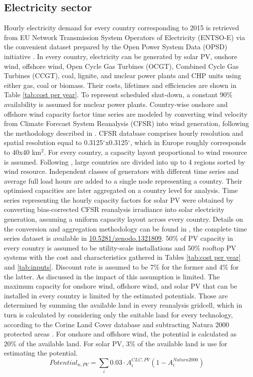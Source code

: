 \documentclass[3p]{elsarticle} %
\begin{document}
\subsection{Electricity sector}
Hourly electricity demand for every country corresponding to 2015 is retrieved from EU Network Transmission System Operators of Electricity (ENTSO-E) via the convenient dataset prepared by the Open Power System Data (OPSD) initiative \cite{OPSD}. In every country, electricity can be generated by solar PV, onshore wind, offshore wind, Open Cycle Gas Turbines (OCGT), Combined Cycle Gas Turbines (CCGT), coal, lignite, and nuclear power plants and CHP units using either gas, coal or biomass. Their costs, lifetimes and efficiencies are shown in Table \ref{tab:cost per year}.  To represent scheduled shut-down, a constant 90\% availability is assumed for nuclear power plants. Country-wise onshore and offshore wind capacity factor time series are modeled by converting wind velocity from Climate Forecast System Reanalysis (CFSR) \cite{CFSR} into wind generation, following the methodology described in \cite{Andresen_2015}. CFSR database comprises hourly resolution and spatial resolution equal to 0.3125$^{\circ}$x0.3125$^{\circ}$, which in Europe roughly corresponds to 40x40 km$^2$. For every country, a capacity layout proportional to wind resource is assumed. Following \cite{Schlachtberger_2017}, large countries are divided into up to 4 regions sorted by wind resource. Independent classes of generators with different time series and average full load hours are added to a single node representing a country. Their optimised capacities are later aggregated on a country level for analysis. Time series representing the hourly capacity factors for solar PV were obtained by converting bias-corrected CFSR reanalysis irradiance into solar electricity generation, assuming a uniform capacity layout across every country. Details on the conversion and aggregation methodology can be found in \cite{Victoria_2019b}, the complete time series dataset is available in \href{https://doi.org/10.5281/zenodo.1321809}{10.5281/zenodo.1321809}. 50\% of PV capacity in every country is assumed to be utility-scale installations and 50\% rooftop PV systems with the cost and characteristics gathered in Tables \ref{tab:cost per year} and \ref{tab:inputs}. Discount rate is assumed to be 7\% for the former and 4\% for the latter. As discussed in \cite{Victoria_2019_EUPVSEC} the impact of this assumption is limited. The maximum capacity for onshore wind, offshore wind, and solar PV that can be installed in every country is limited by the estimated potentials. Those are determined by summing the available land in every reanalysis gridcell, which in turn is calculated by considering only the suitable land for every technology, according to the Corine Land Cover database \cite{Corine_2014} and subtracting Natura 2000 protected areas \cite{Natura2000}. For onshore and offshore wind, the potential is calculated as 20\% of the available land. For solar PV, 3\% of the available land is use for estimating the potential.
\begin{equation}
	Potential_{n, PV} =\sum_i 0.03 \cdot A^{CLC, PV}_i (1- A^{Natura 2000}_i) 
\end{equation}
\end{document}
